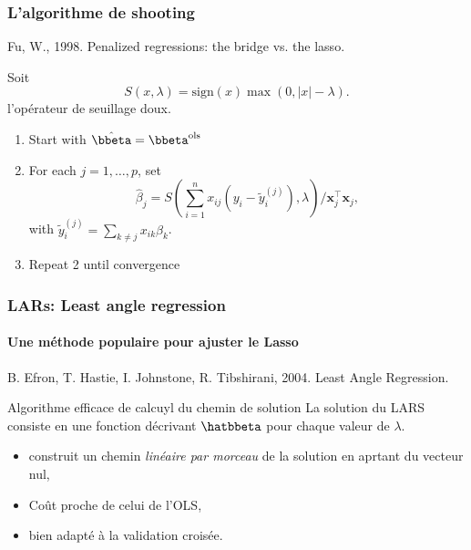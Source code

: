 \documentclass{beamer}\usepackage[]{graphicx}\usepackage[]{color}
\begin{document}
\begin{frame}
  \frametitle{L'algorithme de shooting}

  \begin{thebibliography}{99}
   Fu, W., 1998.
    \newblock Penalized regressions: the bridge vs. the lasso.
  \end{thebibliography}

  \vfill

  Soit
  \begin{equation*}
    S(x,\lambda) = \mathrm{sign}(x) \max(0, |x|-\lambda ).
  \end{equation*}
  l'opérateur de seuillage doux.
 
  \begin{enumerate}
  \item Start with $\hat{\bbeta} = \bbeta^{\text{ols}}$
  \item For each $j=1,\dots,p$, set
    \begin{equation*}
      \hat{\beta}_j     =     S\left(\sum_{i=1}^n    x_{ij}(y_i     -
        \tilde{y}_i^{(j)}) ,\lambda \right) / 
      \mathbf{x}_j^\intercal \mathbf{x}_j,
    \end{equation*}
    with $\tilde{y}_i^{(j)} = \sum_{k\neq j} x_{ik} \hat{\beta}_k$.
  \item Repeat 2 until convergence
  \end{enumerate}
\end{frame}

\begin{frame}
  \frametitle{LARs: Least angle regression}
\framesubtitle{Une méthode populaire pour ajuster le Lasso}
  \begin{thebibliography}{99}
     B.   Efron,    T.   Hastie,   I.   Johnstone,
    R. Tibshirani, 2004. \newblock Least Angle Regression.
  \end{thebibliography}

  \vfill
  
  \begin{block}{Algorithme efficace de calcuyl du chemin de solution}
    La solution du  LARS  consiste en une fonction  décrivant
    $\hatbbeta$ pour chaque valeur de  $\lambda$.
    
    \begin{itemize}
    \item  construit un chemin   \textit{linéaire par morceau}  de la solution en aprtant du vecteur nul,
    \item Coût proche de celui de l'OLS, 
    \item bien adapté à la validation croisée.
    \end{itemize}
  \end{block}
    
\end{frame}
\end{document}
